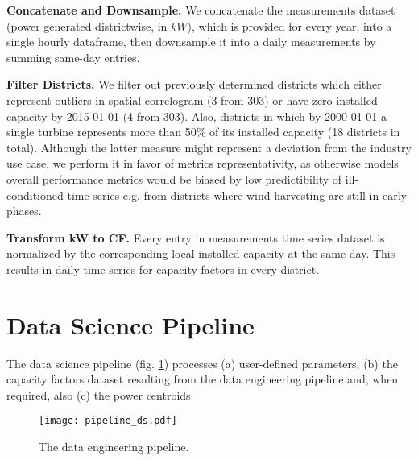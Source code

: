 \vspace{1em}
\noindent
\textbf{Concatenate and Downsample.}  We concatenate the measurements dataset (power generated districtwise, in $kW$), which is provided for every year, into a single hourly dataframe, then downsample it into a daily measurements by summing same-day entries.

\vspace{1em}
\noindent
\textbf{Filter Districts.}   We filter out previously determined districts  which either represent outliers in spatial correlogram (3 from 303) or have zero installed capacity by 2015-01-01 (4 from 303).
Also, districts in which by 2000-01-01 a single turbine represents more than 50\% of its installed capacity (18 districts in total).
Although the latter measure might represent a deviation from the industry use case, we perform it in favor of metrics representativity, as otherwise models overall performance metrics would be biased by low predictibility of ill-conditioned time series e.g. from districts where wind harvesting are still in early phases.

\vspace{1em}
\noindent
\textbf{Transform kW to CF.}  Every entry in measurements time series dataset is normalized by the corresponding local installed capacity at the same day.
This results in daily time series for capacity factors in every district.

\pagebreak

\section{Data Science Pipeline}
The data science pipeline (fig. \ref{fig:pipeline_ds}) processes (a) user-defined parameters, (b) the capacity factors dataset resulting from the data engineering pipeline and, when required, also (c) the power centroids.

\begin{figure}[H]
	\centering
    \caption{The data engineering pipeline.}
    \texttt{[image: pipeline\_ds.pdf]}
	\label{fig:pipeline_ds}
\end{figure}

\pagebreak


